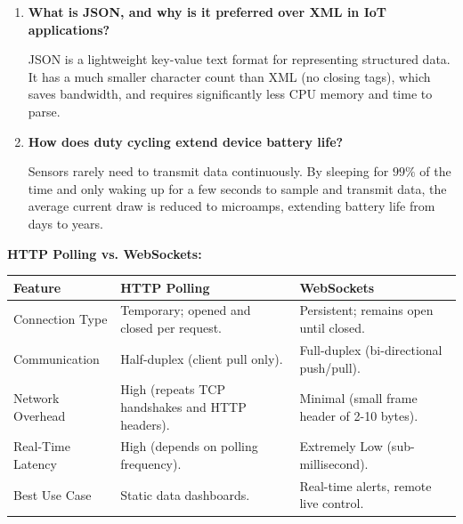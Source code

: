 \documentclass[12pt,a4paper]{article}
\newcommand{\Q}[1]{\textbf{#1}\par\noindent\ignorespaces}
\renewcommand{\arraystretch}{1.45}
\begin{document}
\begin{tcolorbox}[exambox, title={\textbf{Frequently Asked / Viva Questions}}]
\begin{enumerate}[leftmargin=*, topsep=0pt, label=\textbf{Q\arabic*.}, itemsep=6pt]
  \item \Q{What is JSON, and why is it preferred over XML in IoT applications?}
        JSON is a lightweight key-value text format for representing structured data. It has a much smaller character count than XML (no closing tags), which saves bandwidth, and requires significantly less CPU memory and time to parse.
        
  \item \Q{How does duty cycling extend device battery life?}
        Sensors rarely need to transmit data continuously. By sleeping for $99\%$ of the time and only waking up for a few seconds to sample and transmit data, the average current draw is reduced to microamps, extending battery life from days to years.
\end{enumerate}
\end{tcolorbox}

\vspace{6pt}

\begin{tcolorbox}[tikzbox, title={\textbf{Comparison Snapshot}}]
\textbf{HTTP Polling vs. WebSockets:}\par\vspace{6pt}\noindent
{\renewcommand{\arraystretch}{1.35}%
\begin{tabularx}{\linewidth}{|B{3.2cm}|Y|Y|}
\hline
\textbf{Feature} & \textbf{HTTP Polling} & \textbf{WebSockets} \\
\hline
Connection Type & Temporary; opened and closed per request. & Persistent; remains open until closed. \\
\hline
Communication & Half-duplex (client pull only). & Full-duplex (bi-directional push/pull). \\
\hline
Network Overhead & High (repeats TCP handshakes and HTTP headers). & Minimal (small frame header of 2-10 bytes). \\
\hline
Real-Time Latency & High (depends on polling frequency). & Extremely Low (sub-millisecond). \\
\hline
Best Use Case & Static data dashboards. & Real-time alerts, remote live control. \\
\hline
\end{tabularx}}
\end{tcolorbox}
\end{document}
